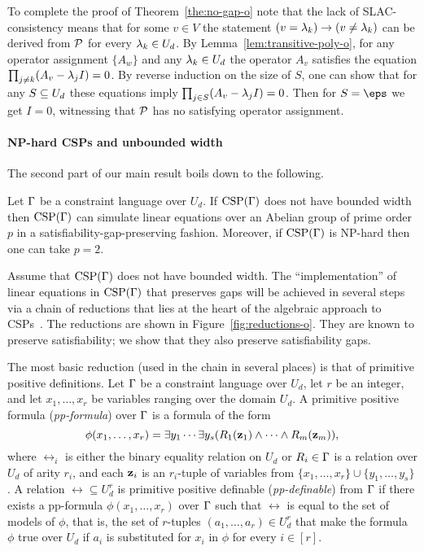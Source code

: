 To complete the proof of Theorem~\ref{the:no-gap-o} note that the lack of
SLAC-consistency means that for some $v\in V$ the statement 
$(v=\lambda_k)\to(v\ne\lambda_k)$ can be derived from ${\mathcal P}$ for every $\lambda_k\in U_d$.
By Lemma~\ref{lem:transitive-poly-o}, for any operator assignment $\{A_w\}$
and any $\lambda_k\in U_d$ the operator $A_v$ satisfies the equation
$\prod_{j\ne k}(A_v-\lambda_jI)=0$.
By reverse induction on the size of $S$, one can show that for any $S\subseteq U_d$ these equations imply 
$\prod_{j\in S}(A_v-\lambda_jI)=0$.
Then for $S=\eps$ we get $I=0$, witnessing that ${\mathcal P}$ has no satisfying 
operator assignment. 

\paragraph{NP-hard CSPs and unbounded width}

The second part of our main result boils down to the following.

\begin{theorem}\label{the:hsp-gap-o}
Let $\Gamma$ be a constraint language over $U_d$. 
If ${\rm CSP}(\Gamma)$ does not have bounded width then ${\rm CSP}(\Gamma)$ can simulate linear
  equations over an Abelian group of prime order $p$ in a
  satisfiability-gap-preserving fashion. Moreover, if ${\rm CSP}(\Gamma)$ is NP-hard
  then one can take $p=2$.
\end{theorem}


Assume that ${\rm CSP}(\Gamma)$ does not have bounded width. The ``implementation'' of
linear equations in ${\rm CSP}(\Gamma)$ that preserves gaps will be achieved
in several steps via a 
chain of reductions that lies at the heart of the algebraic approach to CSPs~\cite{Bulatov05:classifying}. 
%
The reductions are shown in Figure~\ref{fig:reductions-o}. They are
known to preserve satisfiability; we show that they also preserve satisfiability
gaps. 

The most basic reduction (used in the chain in several places) is that of
primitive positive definitions. 
%
Let $\Gamma$ be a constraint language over $U_d$, let $r$ be an integer, and
let $x_1,\ldots,x_r$ be variables ranging over the domain $U_d$. A primitive
positive formula (\emph{pp-formula}) over $\Gamma$ is a formula of the form
%
\begin{equation}\label{eq:pp-formula-o}
  \phi(x_1,\ldots,x_r)=\exists y_1\cdots\exists y_s(R_1({\bf z}_1)\wedge\cdots\wedge
  R_m({\bf z}_m)),
\end{equation}
%
where $\rel_i$ is either the binary equality relation on $U_d$ or $R_i\in\Gamma$ is a relation over $U_d$ of arity $r_i$, and each ${\bf z}_i$ is an $r_i$-tuple of variables from
$\{x_1,\ldots,x_r\}\cup\{y_1,\ldots,y_s\}$.
%
A relation $\rel\subseteq U_d^r$ is primitive positive definable
(\emph{pp-definable}) from $\Gamma$ if there
exists a pp-formula $\phi(x_1,\ldots,x_r)$ over $\Gamma$ such that $\rel$ is equal to the set of
models of $\phi$, that is, the set of $r$-tuples $(a_1,\ldots,a_r)\in U_d^r$
that make the formula $\phi$ true over $U_d$ if $a_i$ is
substituted for $x_i$ in $\phi$ for every $i\in [r]$.

